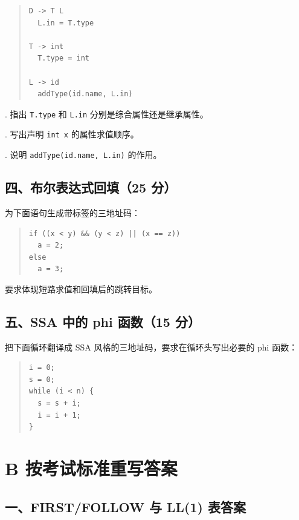 \documentclass[UTF8,zihao=-4]{ctexart}
\begin{document}
\begin{quote}
\footnotesize
\begin{verbatim}
D -> T L
  L.in = T.type

T -> int
  T.type = int

L -> id
  addType(id.name, L.in)
\end{verbatim}
\end{quote}

. 指出 \texttt{T.type} 和 \texttt{L.in} 分别是综合属性还是继承属性。\par
{}. 写出声明 \texttt{int x} 的属性求值顺序。\par
{}. 说明 \texttt{addType(id.name, L.in)} 的作用。\par

\subsection*{四、布尔表达式回填（25 分）}

为下面语句生成带标签的三地址码：

\begin{quote}
\footnotesize
\begin{verbatim}
if ((x < y) && (y < z) || (x == z))
  a = 2;
else
  a = 3;
\end{verbatim}
\end{quote}

要求体现短路求值和回填后的跳转目标。

\subsection*{五、SSA 中的 phi 函数（15 分）}

把下面循环翻译成 SSA 风格的三地址码，要求在循环头写出必要的 phi 函数：

\begin{quote}
\footnotesize
\begin{verbatim}
i = 0;
s = 0;
while (i < n) {
  s = s + i;
  i = i + 1;
}
\end{verbatim}
\end{quote}

\section*{B 按考试标准重写答案}

\subsection*{一、FIRST/FOLLOW 与 LL(1) 表答案}
\end{document}

